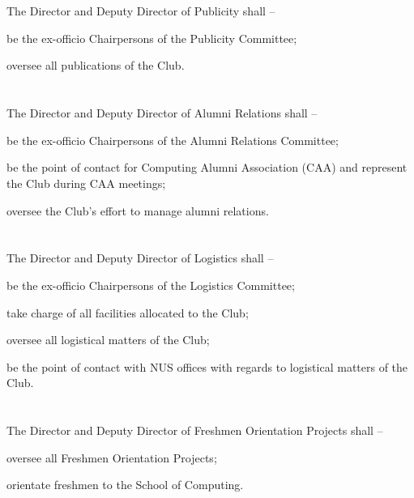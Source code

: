 \section{}
The Director and Deputy Director of Publicity shall –
	\begin{legal}
	\item be the ex-officio Chairpersons of the Publicity Committee;
	\item oversee all publications of the Club.
	\end{legal}

\section{}
The Director and Deputy Director of Alumni Relations shall –
	\begin{legal}
	\item be the ex-officio Chairpersons of the Alumni Relations Committee;
	\item be the point of contact for Computing Alumni Association (CAA) and represent the Club during CAA meetings;
	\item oversee the Club's effort to manage alumni relations.
	\end{legal}

\section{}
The Director and Deputy Director of Logistics shall –
	\begin{legal}
	\item be the ex-officio Chairpersons of the Logistics Committee;
	\item take charge of all facilities allocated to the Club;
	\item oversee all logistical matters of the Club;
	\item be the point of contact with NUS offices with regards to logistical matters of the Club.
	\end{legal}

\section{}
The Director and Deputy Director of Freshmen Orientation Projects shall –
	\begin{legal}
	\item oversee all Freshmen Orientation Projects;
	\item orientate freshmen to the School of Computing.
	\end{legal}

